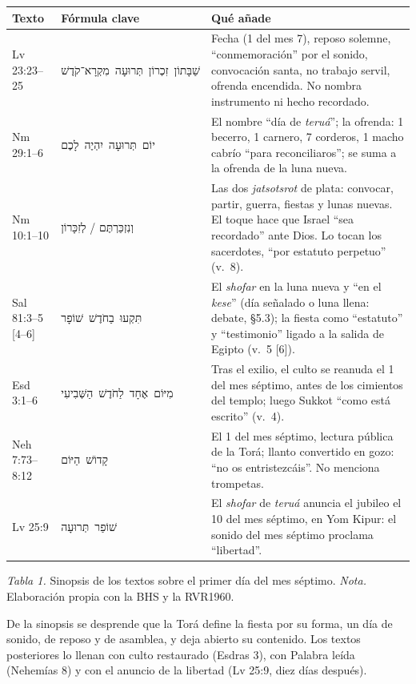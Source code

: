 \documentclass[11pt,letterpaper]{article}
\newcommand{\heb}[1]{\mbox{\foreignlanguage{hebrew}{#1}}}
\begin{document}
\begin{center}\begin{minipage}{\linewidth}\centering\small\renewcommand{\arraystretch}{1.18}
\begin{tabular}{@{}L{2.2cm}L{4.6cm}L{7.6cm}@{}}
\toprule
\textbf{Texto} & \textbf{Fórmula clave} & \textbf{Qué añade} \\ \midrule
Lv 23:23--25 & \heb{שַׁבָּתוֹן זִכְרוֹן תְּרוּעָה מִקְרָא־קֹדֶשׁ} & Fecha (1 del mes 7), reposo solemne, ``conmemoración'' por el sonido, convocación santa, no trabajo servil, ofrenda encendida. No nombra instrumento ni hecho recordado. \\
Nm 29:1--6 & \heb{יוֹם תְּרוּעָה יִהְיֶה לָכֶם} & El nombre ``día de \emph{teruá}''; la ofrenda: 1 becerro, 1 carnero, 7 corderos, 1 macho cabrío ``para reconciliaros''; se suma a la ofrenda de la luna nueva. \\
Nm 10:1--10 & \heb{וְנִזְכַּרְתֶּם} / \heb{לְזִכָּרוֹן} & Las dos \emph{jatsotsrot} de plata: convocar, partir, guerra, fiestas y lunas nuevas. El toque hace que Israel ``sea recordado'' ante Dios. Lo tocan los sacerdotes, ``por estatuto perpetuo'' (v.~8). \\
Sal 81:3--5 [4--6] & \heb{תִּקְעוּ בַחֹדֶשׁ שׁוֹפָר} & El \emph{shofar} en la luna nueva y ``en el \emph{kese}'' (día señalado o luna llena: debate, §5.3); la fiesta como ``estatuto'' y ``testimonio'' ligado a la salida de Egipto (v.~5 [6]). \\
Esd 3:1--6 & \heb{מִיּוֹם אֶחָד לַחֹדֶשׁ הַשְּׁבִיעִי} & Tras el exilio, el culto se reanuda el 1 del mes séptimo, antes de los cimientos del templo; luego Sukkot ``como está escrito'' (v.~4). \\
Neh 7:73--8:12 & \heb{קָדוֹשׁ הַיּוֹם} & El 1 del mes séptimo, lectura pública de la Torá; llanto convertido en gozo: ``no os entristezcáis''. No menciona trompetas. \\
Lv 25:9 & \heb{שׁוֹפַר תְּרוּעָה} & El \emph{shofar} de \emph{teruá} anuncia el jubileo el 10 del mes séptimo, en Yom Kipur: el sonido del mes séptimo proclama ``libertad''. \\
\bottomrule
\end{tabular}\par
{\footnotesize\color{sepia}\textit{Tabla 1.} Sinopsis de los textos sobre el primer día del mes séptimo. \textit{Nota.} Elaboración propia con la BHS y la RVR1960.}
\end{minipage}\end{center}

De la sinopsis se desprende que la Torá define la fiesta por su forma, un día de sonido, de reposo y de asamblea, y deja abierto su contenido. Los textos posteriores lo llenan con culto restaurado (Esdras 3), con Palabra leída (Nehemías 8) y con el anuncio de la libertad (Lv 25:9, diez días después).
\end{document}
